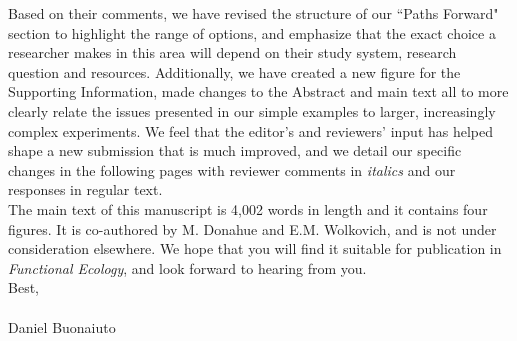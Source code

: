 \documentclass[11 pt]{article}
\begin{document}
\noindent Based on their comments, we have revised the structure of our ``Paths Forward" section to highlight the range of options, and emphasize that the exact choice a researcher makes in this area will depend on their study system, research question and resources. Additionally, %
we have created a new figure for the Supporting Information, made changes to the Abstract and main text all to more clearly relate the issues presented in our simple examples to larger, increasingly complex experiments. We feel that the editor's and reviewers' input has helped shape a new submission that is much improved, and we detail our specific changes in the following pages with reviewer comments in \emph{italics} and our responses in regular text.\\

\noindent The main text of this manuscript is 4,002 words in length and it contains four figures. It is co-authored by M. Donahue and E.M. Wolkovich, and is not under consideration elsewhere. We hope that you will find it suitable for publication in \textit{Functional Ecology}, and look forward to hearing from you.\\


\noindent Best,\\
\\



\noindent Daniel Buonaiuto
\end{document}
